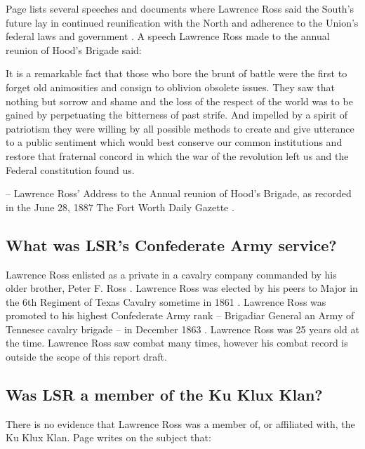 \documentclass[12pt]{article}
\begin{document}
Page lists several speeches and documents where Lawrence Ross said the South's future lay in continued reunification with the North and adherence to the Union's federal laws and government \cite[pg. 161--167]{page}. A speech Lawrence Ross made to the annual reunion of Hood's Brigade said:

\begin{displayquote}
It is a remarkable fact that those who bore the brunt of battle were the first to forget old animosities and consign to oblivion obsolete issues.  They saw that nothing but sorrow and shame and the loss of the respect of the world was to be gained by perpetuating the bitterness of past strife.  And impelled by a spirit of patriotism they were willing by all possible methods to create and give utterance to a public sentiment which would best conserve our common institutions and restore that fraternal concord in which the war of the revolution left us and the Federal constitution found us.

-- Lawrence Ross' Address to the Annual reunion of Hood's Brigade, as recorded in the June 28, 1887 The Fort Worth Daily Gazette \cite{fwg:1887-06-28}.
\end{displayquote}

\subsection{What was LSR's Confederate Army service?}
Lawrence Ross enlisted as a private in a cavalry company commanded by his older brother, Peter F. Ross \cite{rosspapersummary}. Lawrence Ross was elected by his peers to Major in the 6th Regiment of Texas Cavalry sometime in 1861 \cite[pg. 36--37]{texasbrigade}. Lawrence Ross was promoted to his highest Confederate Army rank -- Brigadiar General an Army of Tennesee cavalry brigade -- in December 1863 \cite{rosspapersummary}. Lawrence Ross was 25 years old at the time. Lawrence Ross saw combat many times, however his combat record is outside the scope of this report draft. 

\subsection{Was LSR a member of the Ku Klux Klan?}
There is no evidence that Lawrence Ross was a member of, or affiliated with, the Ku Klux Klan. Page writes on the subject that:
\end{document}
